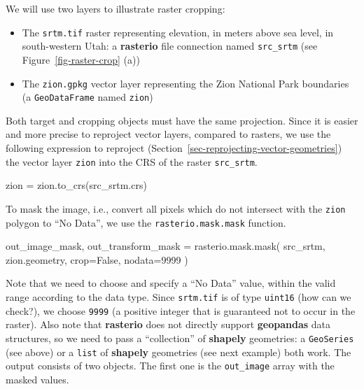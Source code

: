 \documentclass[
  letterpaper,
]{krantz}
\newenvironment{Shaded}{\begin{snugshade}}{\end{snugshade}}
\newcommand{\DecValTok}[1]{\textcolor[rgb]{0.68,0.00,0.00}{#1}}
\newcommand{\NormalTok}[1]{\textcolor[rgb]{0.00,0.23,0.31}{#1}}
\newcommand{\OperatorTok}[1]{\textcolor[rgb]{0.37,0.37,0.37}{#1}}
\newcommand{\VariableTok}[1]{\textcolor[rgb]{0.07,0.07,0.07}{#1}}
\providecommand{\tightlist}{%
  \setlength{\itemsep}{0pt}\setlength{\parskip}{0pt}}\usepackage{longtable,booktabs,array}
\begin{document}
We will use two layers to illustrate raster cropping:

\begin{itemize}
\tightlist
\item
  The \texttt{srtm.tif} raster representing elevation, in meters above
  sea level, in south-western Utah: a \textbf{rasterio} file connection
  named \texttt{src\_srtm} (see Figure~\ref{fig-raster-crop} (a))
\item
  The \texttt{zion.gpkg} vector layer representing the Zion National
  Park boundaries (a \texttt{GeoDataFrame} named \texttt{zion})
\end{itemize}

Both target and cropping objects must have the same projection. Since it
is easier and more precise to reproject vector layers, compared to
rasters, we use the following expression to reproject
(Section~\ref{sec-reprojecting-vector-geometries}) the vector layer
\texttt{zion} into the CRS of the raster \texttt{src\_srtm}.

\begin{Shaded}
\begin{Highlighting}[]
\NormalTok{zion }\OperatorTok{=}\NormalTok{ zion.to\_crs(src\_srtm.crs)}
\end{Highlighting}
\end{Shaded}

To mask the image, i.e., convert all pixels which do not intersect with
the \texttt{zion} polygon to ``No Data'', we use the
\texttt{rasterio.mask.mask} function.

\begin{Shaded}
\begin{Highlighting}[]
\NormalTok{out\_image\_mask, out\_transform\_mask }\OperatorTok{=}\NormalTok{ rasterio.mask.mask(}
\NormalTok{    src\_srtm, }
\NormalTok{    zion.geometry, }
\NormalTok{    crop}\OperatorTok{=}\VariableTok{False}\NormalTok{, }
\NormalTok{    nodata}\OperatorTok{=}\DecValTok{9999}
\NormalTok{)}
\end{Highlighting}
\end{Shaded}

Note that we need to choose and specify a ``No Data'' value, within the
valid range according to the data type. Since \texttt{srtm.tif} is of
type \texttt{uint16} (how can we check?), we choose \texttt{9999} (a
positive integer that is guaranteed not to occur in the raster). Also
note that \textbf{rasterio} does not directly support \textbf{geopandas}
data structures, so we need to pass a ``collection'' of \textbf{shapely}
geometries: a \texttt{GeoSeries} (see above) or a \texttt{list} of
\textbf{shapely} geometries (see next example) both work. The output
consists of two objects. The first one is the \texttt{out\_image} array
with the masked values.
\end{document}
